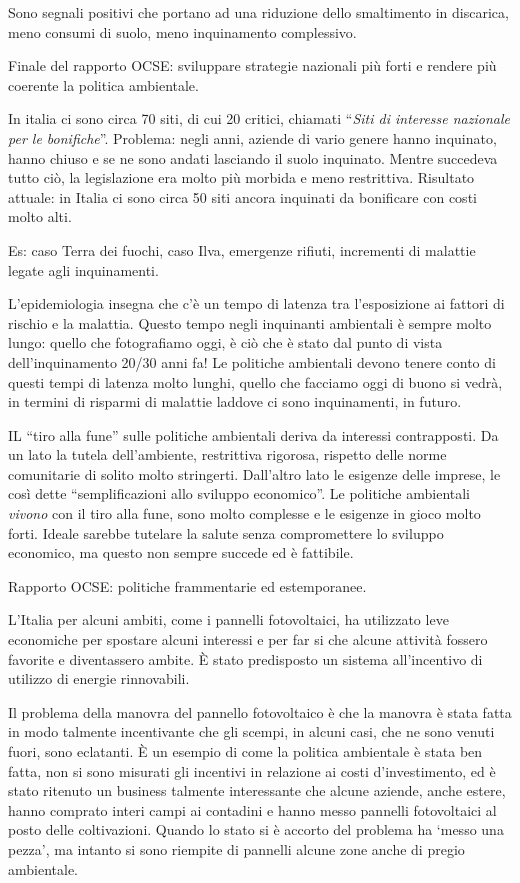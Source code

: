 Sono segnali positivi che portano ad una riduzione dello smaltimento in
discarica, meno consumi di suolo, meno inquinamento complessivo.

Finale del rapporto OCSE: sviluppare strategie nazionali più forti e
rendere più coerente la politica ambientale.

In italia ci sono circa 70 siti, di cui 20 critici, chiamati
``\emph{Siti di interesse nazionale per le bonifiche}''. Problema: negli
anni, aziende di vario genere hanno inquinato, hanno chiuso e se ne sono
andati lasciando il suolo inquinato. Mentre succedeva tutto ciò, la
legislazione era molto più morbida e meno restrittiva. Risultato
attuale: in Italia ci sono circa 50 siti ancora inquinati da bonificare
con costi molto alti.

Es: caso Terra dei fuochi, caso Ilva, emergenze rifiuti, incrementi di
malattie legate agli inquinamenti.

L'epidemiologia insegna che c'è un tempo di latenza tra l'esposizione ai
fattori di rischio e la malattia. Questo tempo negli inquinanti
ambientali è sempre molto lungo: quello che fotografiamo oggi, è ciò che
è stato dal punto di vista dell'inquinamento 20/30 anni fa! Le politiche
ambientali devono tenere conto di questi tempi di latenza molto lunghi,
quello che facciamo oggi di buono si vedrà, in termini di risparmi di
malattie laddove ci sono inquinamenti, in futuro.

IL ``tiro alla fune'' sulle politiche ambientali deriva da interessi
contrapposti. Da un lato la tutela dell'ambiente, restrittiva rigorosa,
rispetto delle norme comunitarie di solito molto stringerti. Dall'altro
lato le esigenze delle imprese, le così dette ``semplificazioni allo
sviluppo economico''. Le politiche ambientali \emph{vivono} con il tiro
alla fune, sono molto complesse e le esigenze in gioco molto forti.
Ideale sarebbe tutelare la salute senza compromettere lo sviluppo
economico, ma questo non sempre succede ed è fattibile.

Rapporto OCSE: politiche frammentarie ed estemporanee.

L'Italia per alcuni ambiti, come i pannelli fotovoltaici, ha utilizzato
leve economiche per spostare alcuni interessi e per far si che alcune
attività fossero favorite e diventassero ambite. È stato predisposto un
sistema all'incentivo di utilizzo di energie rinnovabili.

Il problema della manovra del pannello fotovoltaico è che la manovra è
stata fatta in modo talmente incentivante che gli scempi, in alcuni
casi, che ne sono venuti fuori, sono eclatanti. È un esempio di come la
politica ambientale è stata ben fatta, non si sono misurati gli
incentivi in relazione ai costi d'investimento, ed è stato ritenuto un
business talmente interessante che alcune aziende, anche estere, hanno
comprato interi campi ai contadini e hanno messo pannelli fotovoltaici
al posto delle coltivazioni. Quando lo stato si è accorto del problema
ha `messo una pezza', ma intanto si sono riempite di pannelli alcune
zone anche di pregio ambientale.

